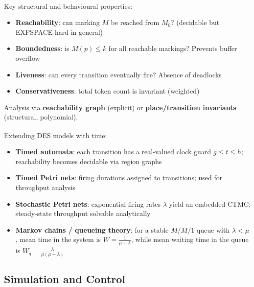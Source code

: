 \begin{tcbitemize}[ skin=sectionraster ]
    \tcbitem[title={Petri Net Properties and Analysis}, raster multicolumn=3]
    Key structural and behavioural properties\textsuperscript{\cite[][pp.~40--80]{reisigUnderstandingPetriNets2013}}:
    \begin{itemize}
        \item \textbf{Reachability}: can marking $M$ be reached from $M_0$? (decidable but EXPSPACE-hard in general)
        \item \textbf{Boundedness}: is $M(p) \leq k$ for all reachable markings? Prevents buffer overflow
        \item \textbf{Liveness}: can every transition eventually fire? Absence of deadlocks
        \item \textbf{Conservativeness}: total token count is invariant (weighted)
    \end{itemize}
    Analysis via \textbf{reachability graph} (explicit) or \textbf{place/transition invariants} (structural, polynomial).

    \tcbitem[title={Timed and Stochastic Models}, raster multicolumn=3]
    Extending DES models with time\textsuperscript{\cite[][pp.~250--280]{cassandrasIntroductionDiscreteEvent2009}}:
    \begin{itemize}
        \item \textbf{Timed automata}: each transition has a real-valued clock guard $g \leq t \leq h$; reachability becomes decidable via region graphs
        \item \textbf{Timed Petri nets}: firing durations assigned to transitions; used for throughput analysis
        \item \textbf{Stochastic Petri nets}: exponential firing rates $\lambda$ yield an embedded CTMC; steady-state throughput solvable analytically
        \item \textbf{Markov chains / queueing theory}: for a stable $M/M/1$ queue with $\lambda<\mu$, mean time in the system is $W=\frac{1}{\mu-\lambda}$, while mean waiting time in the queue is $W_q=\frac{\lambda}{\mu(\mu-\lambda)}$
    \end{itemize}
\end{tcbitemize}

\subsection{Simulation and Control}

